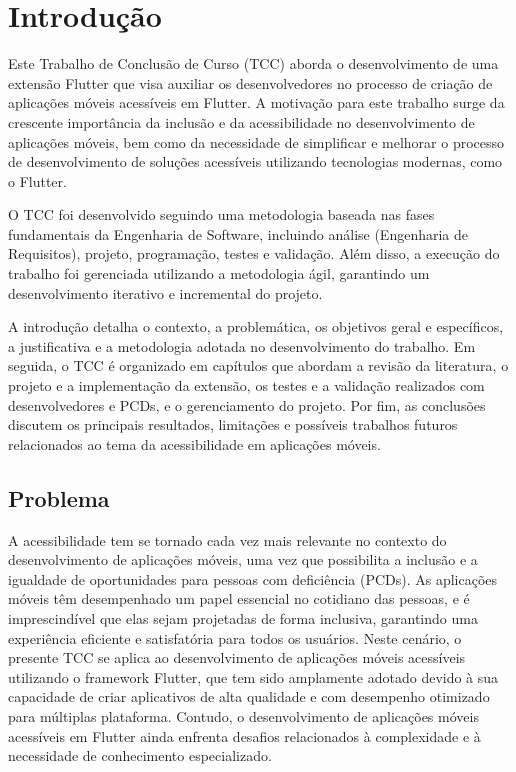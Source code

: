 
\chapter{Introdução}

Este Trabalho de Conclusão de Curso (TCC) aborda o desenvolvimento de uma extensão Flutter que visa auxiliar os desenvolvedores no processo de criação de aplicações móveis acessíveis em Flutter. A motivação para este trabalho surge da crescente importância da inclusão e da acessibilidade no desenvolvimento de aplicações móveis, bem como da necessidade de simplificar e melhorar o processo de desenvolvimento de soluções acessíveis utilizando tecnologias modernas, como o Flutter.

O TCC foi desenvolvido seguindo uma metodologia baseada nas fases fundamentais da Engenharia de Software, incluindo análise (Engenharia de Requisitos), projeto, programação, testes e validação. Além disso, a execução do trabalho foi gerenciada utilizando a metodologia ágil, garantindo um desenvolvimento iterativo e incremental do projeto.

A introdução detalha o contexto, a problemática, os objetivos geral e específicos, a justificativa e a metodologia adotada no desenvolvimento do trabalho. Em seguida, o TCC é organizado em capítulos que abordam a revisão da literatura, o projeto e a implementação da extensão, os testes e a validação realizados com desenvolvedores e PCDs, e o gerenciamento do projeto. Por fim, as conclusões discutem os principais resultados, limitações e possíveis trabalhos futuros relacionados ao tema da acessibilidade em aplicações móveis.

\section{Problema}

A acessibilidade tem se tornado cada vez mais relevante no contexto do desenvolvimento de aplicações móveis, uma vez que possibilita a inclusão e a igualdade de oportunidades para pessoas com deficiência (PCDs). As aplicações móveis têm desempenhado um papel essencial no cotidiano das pessoas, e é imprescindível que elas sejam projetadas de forma inclusiva, garantindo uma experiência eficiente e satisfatória para todos os usuários. Neste cenário, o presente TCC se aplica ao desenvolvimento de aplicações móveis acessíveis utilizando o framework Flutter, que tem sido amplamente adotado devido à sua capacidade de criar aplicativos de alta qualidade e com desempenho otimizado para múltiplas plataforma. Contudo, o desenvolvimento de aplicações móveis acessíveis em Flutter ainda enfrenta desafios relacionados à complexidade e à necessidade de conhecimento especializado.

